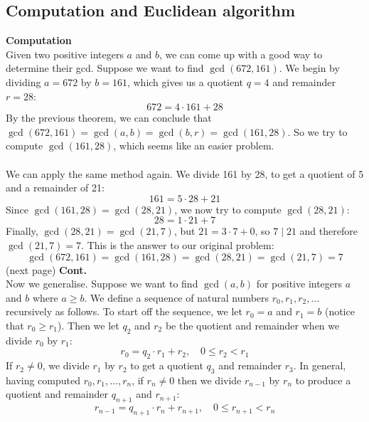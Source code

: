 \documentclass{report}
\theoremstyle{definition}
\begin{document}
\subsection{Computation and Euclidean algorithm}
\noindent\textbf{Computation}\\
Given two positive integers $a$ and $b$, we can come up with a good way to determine their gcd.
Suppose we want to find $\gcd(672,161)$. We begin by dividing $a=672$ by $b=161$, which gives us a quotient $q=4$ and remainder $r=28$:
\begin{equation*}
672=4\cdot161+28
\end{equation*}
By the previous theorem, we can conclude that $\gcd(672,161)=\gcd(a,b)=\gcd(b,r)=\gcd(161,28)$. So we try to compute $\gcd(161,28)$, which seems like an easier problem.\\
\vspace{1mm}\\
We can apply the same method again. We divide 161 by 28, to get a quotient of 5 and a remainder of 21:
\begin{equation*}
161=5\cdot28+21
\end{equation*}
Since $\gcd(161,28)=\gcd(28,21)$, we now try to compute $\gcd(28,21)$:
\begin{equation*}
28=1\cdot21+7
\end{equation*}
Finally, $\gcd(28,21)=\gcd(21,7)$, but $21=3\cdot 7+0$, so $7\mid21$ and therefore $\gcd(21,7)=7$. This is the answer to our original problem:
\begin{equation*}
\gcd(672,161)=\gcd(161,28)=\gcd(28,21)=\gcd(21,7)=7
\end{equation*}
(next page)\newpage
\noindent\textbf{Cont.}\\
Now we generalise. Suppose we want to find $\gcd(a,b)$ for positive integers $a$ and $b$ where $a\geq b$. We define a sequence of natural numbers $r_0,r_1,r_2,\ldots$ recursively as follows.
To start off the sequence, we let $r_0=a$ and $r_1=b$ (notice that $r_0\geq r_1$). Then we let 
$q_2$ and $r_2$ be the quotient and remainder when we divide $r_0$ by $r_1$:
\begin{equation*}
r_0=q_2\cdot r_1+r_2,\quad 0\leq r_2<r_1
\end{equation*}
If $r_2\neq0$, we divide $r_1$ by $r_2$ to get a quotient $q_3$ and remainder $r_3$. In general, having computed $r_0,r_1,\ldots,r_n$, if $r_n\neq0$ then we divide $r_{n-1}$ by $r_n$ to produce a 
quotient and remainder $q_{n+1}$ and $r_{n+1}$:
\begin{equation*}
r_{n-1}=q_{n+1}\cdot r_n+r_{n+1},\quad 0\leq r_{n+1}<r_n
\end{equation*}
\end{document}
